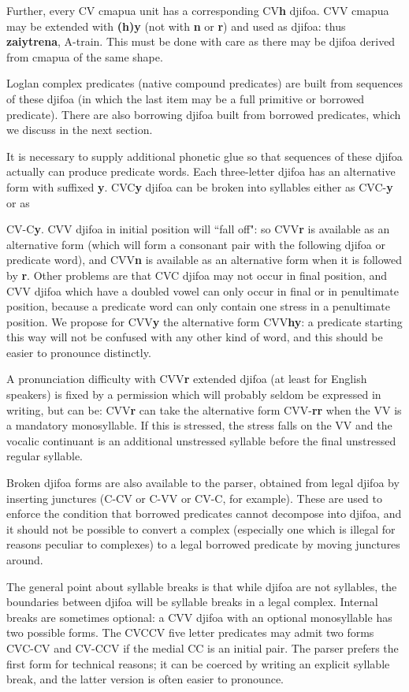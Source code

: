 \documentclass[12pt]{book}
\begin{document}
Further, every CV cmapua unit  has a corresponding CV{\bf h} djifoa.  CVV cmapua  may be extended with {\bf (h)y} (not with {\bf n} or {\bf r}) and used as djifoa:  thus
{\bf zaiytrena}, A-train.  This must be done with care as there may be djifoa derived from cmapua of the same shape.

Loglan complex predicates (native compound predicates) are built from sequences of these djifoa (in which the last item may be a full primitive or borrowed predicate).  There are also borrowing djifoa built from borrowed predicates, which we discuss in the next section.

It is necessary to supply additional phonetic glue so that sequences of these djifoa actually can produce predicate words.  Each three-letter djifoa has an alternative form
with suffixed {\bf y}.  CVC{\bf y}  djifoa can be broken into syllables either as CVC-{\bf y} or as {CV-C{\bf y}.  CVV djifoa in initial position will ``fall off":  so CVV{\bf r} is available as an alternative form (which will form a consonant pair with the following djifoa or predicate word), and CVV{\bf n} is available as an alternative form when it is followed by {\bf r}.  Other problems
are that CVC djifoa may not occur in final position, and CVV djifoa which have a doubled vowel can only occur in final or in penultimate position, because a predicate word can only contain one stress in a penultimate position.  We propose for CVV{\bf y} the alternative form CVV{\bf hy}:  a predicate starting this way will not be confused with any other kind of word, and this should be easier to pronounce distinctly.

A pronunciation difficulty with CVV{\bf r} extended djifoa (at least for English speakers) is fixed by a permission which will probably seldom be expressed in writing, but can be:
CVV{\bf r} can take the alternative form CVV-{\bf rr} when the VV is a mandatory monosyllable.  If this is stressed, the stress falls on the VV and the vocalic continuant is an additional unstressed syllable before the final unstressed regular syllable.

Broken djifoa forms are also available to the parser, obtained from legal djifoa by inserting junctures (C-CV or C-VV  or CV-C, for example).  These are used to enforce the condition that borrowed predicates cannot decompose into djifoa, and it should not be possible to convert a complex (especially one which is illegal for reasons peculiar to complexes) to a legal borrowed predicate by moving junctures around.

The general point about syllable breaks is that while djifoa are not syllables, the boundaries between djifoa will be syllable breaks in a legal complex.  Internal breaks are sometimes
optional:  a CVV djifoa with an optional monosyllable has two possible forms.  The CVCCV five letter predicates may admit two forms CVC-CV and CV-CCV if the medial CC is an initial pair.
The parser prefers the first form for technical reasons;  it can be coerced by writing an explicit syllable break, and the latter version is often easier to pronounce.

}
\end{document}

